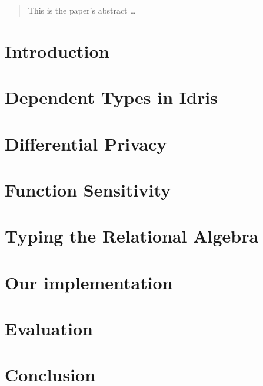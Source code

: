 \documentclass[12pt]{article}
\begin{document}
\maketitle

\lstset{language=Haskell,basicstyle=\footnotesize,frame=single,
        numbers=left}

\begin{abstract}
This is the paper's abstract \ldots
\end{abstract}

\section{Introduction}\label{sec:introduction}
\section{Dependent Types in Idris}\label{sec:dependent_types_in_idris}
\section{Differential Privacy}\label{sec:differential_privacy}
\section{Function Sensitivity}\label{sec:function_sensitivity}
\section{Typing the Relational Algebra}\label{sec:typing_the_relational_algebra}
\section{Our implementation}\label{sec:our_implementation}
\section{Evaluation}\label{sec:evaluation}
\section{Conclusion}\label{sec:conclusion}



\end{document}

